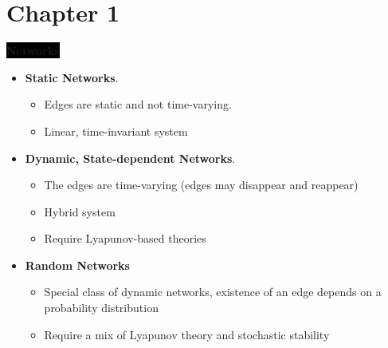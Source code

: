 \section{Chapter 1}

\colorbox{black}{\textbf{\color{white}Networks}}
\begin{itemize}
    \item \textbf{Static Networks}. 
    \begin{itemize}
        \item Edges are static and not time-varying.
        \item Linear, time-invariant system
    \end{itemize}
    \item \textbf{Dynamic, State-dependent Networks}.
    \begin{itemize}
        \item The edges are time-varying (edges may disappear and reappear)
        \item Hybrid system
        \item Require Lyapunov-based theories
    \end{itemize}
    \item \textbf{Random Networks}
    \begin{itemize}
        \item Special class of dynamic networks, existence of an edge depends on a probability distribution
        \item Require a mix of Lyapunov theory and stochastic stability 
    \end{itemize}
\end{itemize}

